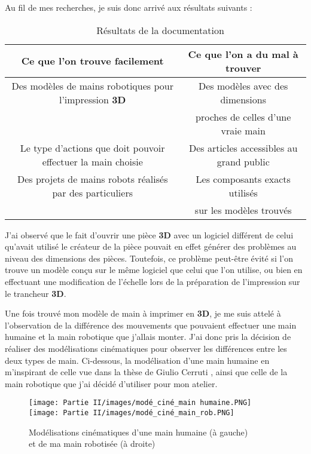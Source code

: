\vspace{0.5cm}
Au fil de mes recherches, je suis donc arrivé aux résultats suivants :
\begin{table}[!h]
    \centering
    \begin{tabular}{|c|c|}
       \hline Ce que l'on trouve facilement  & Ce que l'on a du mal à trouver \\
        \hline Des modèles de mains robotiques pour l'impression \textbf{3D} & Des modèles avec des dimensions \\  & proches de celles d'une vraie main \\
        \hline Le type d'actions que doit pouvoir effectuer la main choisie & Des articles accessibles au grand public \\
        \hline Des projets de mains robots réalisés par des particuliers & Les composants exacts utilisés\\
         & sur les modèles trouvés \\
        \hline
    \end{tabular}
    \caption{\, \, Résultats de la documentation}
    \label{tab_4.1.1.2}
\end{table}

\newpage

J'ai observé que le fait d'ouvrir une pièce \textbf{3D} avec un logiciel différent de celui qu'avait utilisé le créateur de la pièce pouvait en effet générer des problèmes au niveau des dimensions des pièces. Toutefois, ce problème peut-être évité si l'on trouve un modèle conçu sur le même logiciel que celui que l'on utilise, ou bien en effectuant une modification de l'échelle lors de la préparation de l'impression sur le trancheur \textbf{3D}.

\vspace{0.5cm}
Une fois trouvé mon modèle de main à imprimer en \textbf{3D}, je me suis attelé à l'observation de la différence des mouvements que pouvaient effectuer une main humaine et la main robotique que j'allais monter. J'ai donc pris la décision de réaliser des modélisations cinématiques pour observer les différences entre les deux types de main.
Ci-dessous, la modélisation d'une main humaine en m'inspirant de celle vue dans la thèse de Giulio Cerruti \cite{cerruti_design_2016}, ainsi que celle de la main robotique que j'ai décidé d'utiliser pour mon atelier.

\begin{figure}[!h]
    \centering
    \texttt{[image: Partie II/images/modé\_ciné\_main humaine.PNG]}
    \texttt{[image: Partie II/images/modé\_ciné\_main\_rob.PNG]}
    \caption[\, \, Modélisations cinématiques]{\centering Modélisations cinématiques d'une main humaine (à gauche) \\ \centering et de ma main robotisée (à droite)}
    \label{fig_4.1.1.1}
\end{figure}


